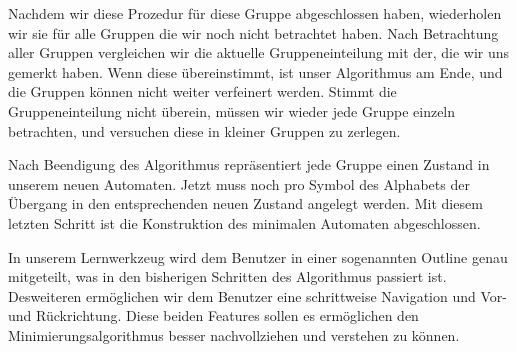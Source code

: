Nachdem wir diese Prozedur für diese Gruppe
abgeschlossen haben, wiederholen wir sie für alle Gruppen die wir noch nicht
betrachtet haben. Nach Betrachtung aller Gruppen vergleichen wir die aktuelle
Gruppeneinteilung mit der, die wir uns gemerkt haben. Wenn diese übereinstimmt,
ist unser Algorithmus am Ende, und die Gruppen können nicht weiter verfeinert
werden. Stimmt die Gruppeneinteilung nicht überein, müssen wir wieder jede
Gruppe einzeln betrachten, und versuchen diese in kleiner Gruppen zu
zerlegen.\vspace{10pt}

Nach Beendigung des Algorithmus repräsentiert jede Gruppe einen Zustand
in unserem neuen Automaten. Jetzt muss noch pro Symbol des Alphabets der
Übergang in den entsprechenden neuen Zustand angelegt werden. Mit diesem
letzten Schritt ist die Konstruktion des minimalen Automaten
abgeschlossen.\vspace{10pt}

In unserem Lernwerkzeug wird dem Benutzer in einer sogenannten Outline genau
mitgeteilt, was in den bisherigen Schritten des Algorithmus passiert ist.
Desweiteren ermöglichen wir dem Benutzer eine schrittweise Navigation und Vor-
und Rückrichtung. Diese beiden Features sollen es ermöglichen den
Minimierungsalgorithmus besser nachvollziehen und verstehen zu
können.\vspace{10pt}


